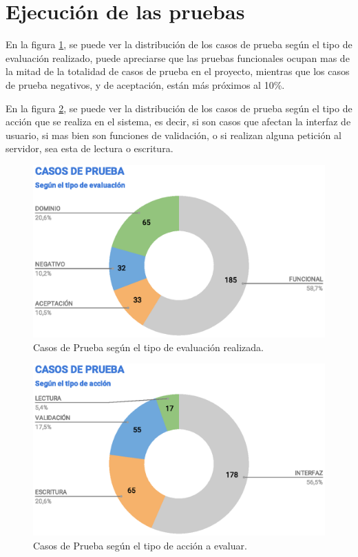 \section{Ejecución de las pruebas}
En la figura \ref{tc-tests}, se puede ver la distribución de los casos de prueba
según el tipo de evaluación realizado, puede apreciarse que las pruebas
funcionales ocupan mas de la mitad de la totalidad de casos de prueba en el
proyecto, mientras que los casos de prueba negativos, y de aceptación, están más
próximos al 10\%.

En la figura \ref{tc-type}, se puede ver la distribución de los casos de prueba
según el tipo de acción que se realiza en el sistema, es decir, si son casos
que afectan la interfaz de usuario, si mas bien son funciones de validación, o
si realizan alguna petición al servidor, sea esta de lectura o escritura.

\begin{figure}[H]
\centering
\includegraphics[width=1.0\textwidth]{graphics/tc-tests.eps}
\caption{Casos de Prueba según el tipo de evaluación realizada.}
\label{tc-tests}
\end{figure}

\begin{figure}[H]
\centering
\includegraphics[width=1.0\textwidth]{graphics/tc-type.eps}
\caption{Casos de Prueba según el tipo de acción a evaluar.}
\label{tc-type}
\end{figure}

